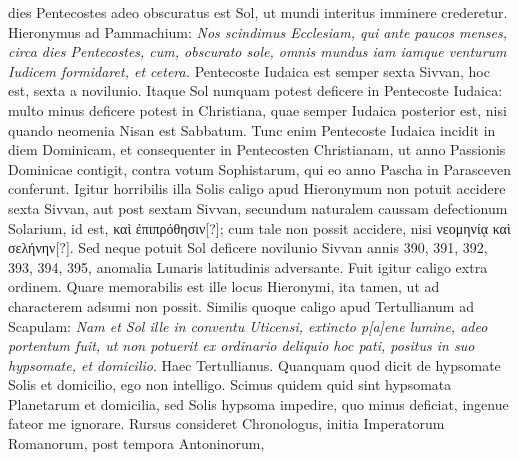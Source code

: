 dies Pentecostes adeo obscuratus est Sol, ut mundi interitus imminere
crederetur.
Hieronymus ad Pammachium: \textit{Nos scindimus Ecclesiam,
qui ante paucos menses, circa dies Pentecostes, cum, obscurato
sole, omnis mundus iam iamque venturum Iudicem formidaret, et cetera.}
Pentecoste Iudaica est semper sexta Sivvan, hoc est, sexta a novilunio.
Itaque Sol nunquam potest deficere in Pentecoste Iudaica: multo minus
deficere potest in Christiana, quae semper Iudaica posterior est, nisi
quando neomenia Nisan est Sabbatum.
Tunc enim Pentecoste Iudaica
incidit in diem Dominicam, et consequenter in Pentecosten Christianam,
ut anno Passionis Dominicae contigit, contra votum Sophistarum,
qui eo anno Pascha in Parasceven conferunt.
Igitur horribilis
illa Solis caligo apud Hieronymum non potuit accidere sexta Sivvan,
aut post sextam Sivvan, secundum naturalem caussam defectionum
Solarium, id est, \textgreek{καὶ ἐπιπρόθησιν[?]}; cum tale non possit
accidere, nisi \textgreek{νεομηνίᾳ καὶ σελήνην[?]}.
Sed neque potuit Sol deficere novilunio
Sivvan annis 390, 391, 392, 393, 394, 395, anomalia Lunaris latitudinis
adversante.
Fuit igitur caligo extra ordinem.
Quare memorabilis
est ille locus Hieronymi, ita tamen, ut ad characterem adsumi non
possit.
Similis quoque caligo apud Tertullianum ad Scapulam: \textit{Nam et
Sol ille in conventu Uticensi, extincto p[a]ene lumine, adeo portentum fuit, ut
non potuerit ex ordinario deliquio hoc pati, positus in suo hypsomate, et
domicilio}.
Haec Tertullianus.
Quanquam quod dicit de hypsomate Solis
et domicilio, ego non intelligo.
Scimus quidem quid sint hypsomata
Planetarum et domicilia, sed Solis hypsoma impedire, quo minus
deficiat, ingenue fateor me ignorare.
Rursus consideret Chronologus,
initia Imperatorum Romanorum, post tempora Antoninorum,
